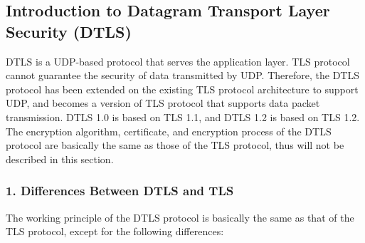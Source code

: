 \documentclass[a4paper,12pt]{book}
\begin{document}
\subsection{Introduction to Datagram Transport Layer Security (DTLS)}
DTLS is a UDP-based protocol that serves the application layer. TLS protocol cannot guarantee the security of data transmitted by UDP. Therefore, the DTLS protocol has been extended on the existing TLS protocol architecture to support UDP, and becomes a version of TLS protocol that supports data packet transmission. DTLS 1.0 is based on TLS 1.1, and DTLS 1.2 is based on TLS 1.2. The encryption algorithm, certificate, and encryption process of the DTLS protocol are basically the same as those of the TLS protocol, thus will not be described in this section.

\subsubsection{1. Differences Between DTLS and TLS}
The working principle of the DTLS protocol is basically the same as that of the TLS protocol, except for the following differences:
\end{document}
